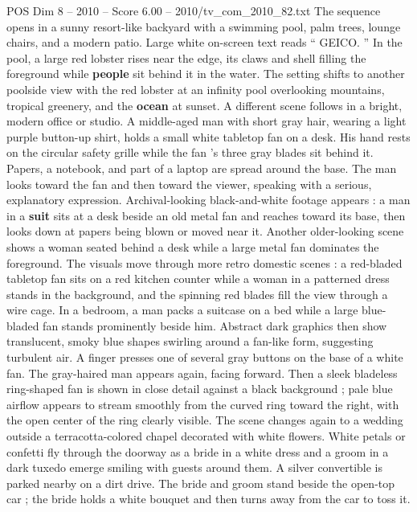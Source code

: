 \begin{textsample}{POS Dim 8 – 2010 – Score 6.00 – 2010/tv\_com\_2010\_82.txt}  \label{ex:f8_pos_030}
The sequence opens in a sunny resort-like backyard with a swimming pool, palm trees, lounge chairs, and a modern patio.
Large white on-screen text reads “ GEICO. ” In the pool, a large red lobster rises near the edge, its claws and shell filling the foreground while \textbf{people} sit behind it in the water.
The setting shifts to another poolside view with the red lobster at an infinity pool overlooking mountains, tropical greenery, and the \textbf{ocean} at sunset.
A different scene follows in a bright, modern office or studio.
A middle-aged man with short gray hair, wearing a light purple button-up shirt, holds a small white tabletop fan on a desk.
His hand rests on the circular safety grille while the fan ’s three gray blades sit behind it.
Papers, a notebook, and part of a laptop are spread around the base.
The man looks toward the fan and then toward the viewer, speaking with a serious, explanatory expression.
Archival-looking black-and-white footage appears : a man in a \textbf{suit} sits at a desk beside an old metal fan and reaches toward its base, then looks down at papers being blown or moved near it.
Another older-looking scene shows a woman seated behind a desk while a large metal fan dominates the foreground.
The visuals move through more retro domestic scenes : a red-bladed tabletop fan sits on a red kitchen counter while a woman in a patterned dress stands in the background, and the spinning red blades fill the view through a wire cage.
In a bedroom, a man packs a suitcase on a bed while a large blue-bladed fan stands prominently beside him.
Abstract dark graphics then show translucent, smoky blue shapes swirling around a fan-like form, suggesting turbulent air.
A finger presses one of several gray buttons on the base of a white fan.
The gray-haired man appears again, facing forward.
Then a sleek bladeless ring-shaped fan is shown in close detail against a black background ; pale blue airflow appears to stream smoothly from the curved ring toward the right, with the open center of the ring clearly visible.
The scene changes again to a wedding outside a terracotta-colored chapel decorated with white flowers.
White petals or confetti fly through the doorway as a bride in a white dress and a groom in a dark tuxedo emerge smiling with guests around them.
A silver convertible is parked nearby on a dirt drive.
The bride and groom stand beside the open-top car ; the bride holds a white bouquet and then turns away from the car to toss it.

\end{textsample}
